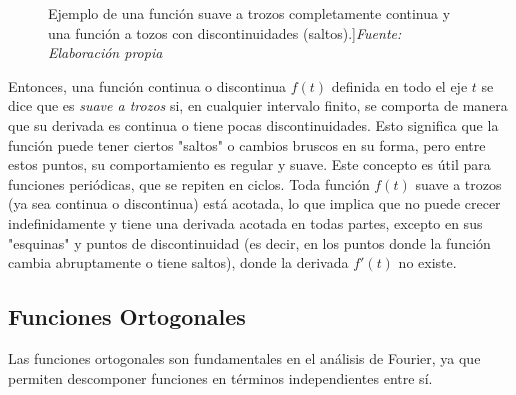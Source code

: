 \begin{figure}[H]
\begin{minipage}{0.5\textwidth}
	\end{minipage}
	\caption[Ejemplo de una función suave a trozos completamente continua y una función a tozos con discontinuidades (saltos).]{Ejemplo de una función suave a trozos completamente continua y una función a tozos con discontinuidades (saltos).]\textit{Fuente: Elaboración propia}}
	\label{fig:funcion-suave-trozos}  %
\end{figure}
Entonces, una función continua o discontinua \( f(t) \) definida en todo el eje \( t \) se dice que es \textit{suave a trozos} si, en cualquier intervalo finito, se comporta de manera que su derivada es continua o tiene pocas discontinuidades. Esto significa que la función puede tener ciertos "saltos" o cambios bruscos en su forma, pero entre estos puntos, su comportamiento es regular y suave. Este concepto es útil para funciones periódicas, que se repiten en ciclos. Toda función \( f(t) \) suave a trozos (ya sea continua o discontinua) está acotada, lo que implica que no puede crecer indefinidamente y tiene una derivada acotada en todas partes, excepto en sus "esquinas" y puntos de discontinuidad (es decir, en los puntos donde la función cambia abruptamente o tiene saltos), donde la derivada \( f'(t) \) no existe. ~\cite{fourierTolstov}

\subsection{Funciones Ortogonales}
Las funciones ortogonales son fundamentales en el análisis de Fourier, ya que permiten descomponer funciones en términos independientes entre sí.

